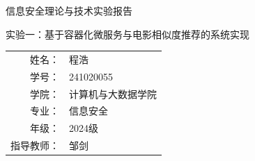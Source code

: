 \documentclass[twoside,fontset=none]{ctexart}
\newcommand{\ReportTitle}{信息安全理论与技术实验报告}
\newcommand{\ExpTitle}{基于容器化微服务与电影相似度推荐的系统实现}
\newcommand{\StudentName}{程浩}
\newcommand{\StudentId}{241020055}
\newcommand{\College}{计算机与大数据学院}
\newcommand{\Major}{信息安全}
\newcommand{\Grade}{2024级}
\newcommand{\Teacher}{邹剑}
\begin{document}
\raggedbottom

\thispagestyle{empty}
\begin{center}
  \vspace*{2cm}
  {\heitib \sanhao \ReportTitle}

  \vspace{2.5cm}
  {\heitib \sihao 实验一：\ExpTitle}

  \vspace{3cm}
  \renewcommand{\arraystretch}{1.8}
  {\song \xiaosihao
  \begin{tabular}{rl}
    姓\hspace{2em}名： & \StudentName \\
    学\hspace{2em}号： & \StudentId \\
    学\hspace{2em}院： & \College \\
    专\hspace{2em}业： & \Major \\
    年\hspace{2em}级： & \Grade \\
    指导教师： & \Teacher \\
  \end{tabular}}
\end{center}
\newpage




\pagestyle{fancy}
\fancyhead{}
\fancyfoot[C]{\thepage}
\renewcommand{\headrulewidth}{1pt}
\renewcommand{\footrulewidth}{0pt}









\end{document}
